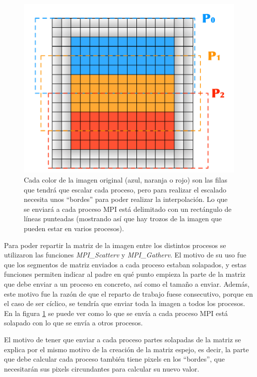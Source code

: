 \documentclass{article}
\begin{document}
\begin{figure}[h]
        \centering
        \includegraphics[angle=0, height=0.3\textheight]{img/repartoMPI.pdf}
        \caption{Cada color de la imagen original (azul, naranja o rojo) son las filas que tendrá que escalar cada proceso, pero para realizar el escalado necesita unos ``bordes'' para poder realizar la interpolación. Lo que se enviará a cada proceso MPI está delimitado con un rectángulo de líneas punteadas (mostrando así que hay trozos de la imagen que pueden estar en varios procesos).}
        \label{fig:repartoMPI}
\end{figure}

Para poder repartir la matriz de la imagen entre los distintos procesos se utilizaron las funciones \emph{MPI\_Scatterv} y \emph{MPI\_Gatherv}. El motivo de su uso fue que los segmentos de matriz enviados a cada proceso estaban solapados, y estas funciones permiten indicar al padre en qué punto empieza la parte de la matriz que debe enviar a un proceso en concreto, así como el tamaño a enviar. Además, este motivo fue la razón de que el reparto de trabajo fuese consecutivo, porque en el caso de ser cíclico, se tendría que enviar toda la imagen a todos los procesos. En la figura \ref{fig:repartoMPI} se puede ver como lo que se envía a cada proceso MPI está solapado con lo que se envía a otros procesos.

El motivo de tener que enviar a cada proceso partes solapadas de la matriz se explica por el mismo motivo de la creación de la matriz espejo, es decir, la parte que debe calcular cada proceso también tiene pixels en los ``bordes'', que necesitarán sus pixels circundantes para calcular su nuevo valor.
\end{document}
